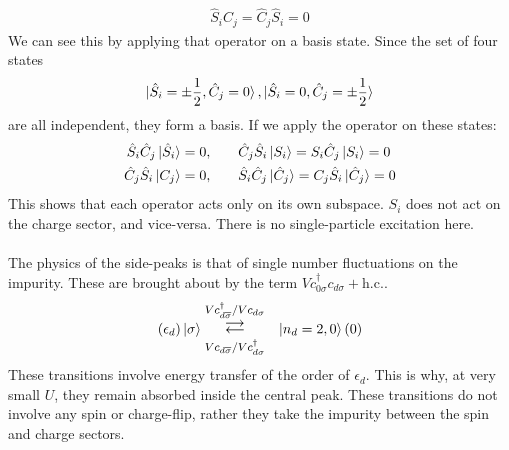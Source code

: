 \documentclass[twoside,11pt]{report}
\numberwithin{equation}{section}
\begin{document}
\begin{equation}\begin{aligned}
	\hat S_i \hat C_j = \hat C_j \hat S_i = 0
\end{aligned}\end{equation}
We can see this by applying that operator on a basis state. Since the set of four states 
\begin{equation}\begin{aligned}
	\ket{\hat S_i = \pm \frac{1}{2}, \hat C_j = 0}, \ket{\hat S_i = 0, \hat C_j = \pm\frac{1}{2}}
\end{aligned}\end{equation}
are all independent, they form a basis. If we apply the operator on these states:
\begin{equation}\begin{aligned}
	\hat S_i \hat C_j \ket{\hat S_i} &= 0, &&&&\hat C_j \hat S_i \ket{S_i} = S_i \hat C_j \ket{S_i} = 0\\
	\hat C_j \hat S_i \ket{C_j} &= 0, &&&&\hat S_i \hat C_j \ket{\hat C_j} = C_j \hat S_i \ket{\hat C_j} = 0 \\
\end{aligned}\end{equation}
This shows that each operator acts only on its own subspace. \(S_i\) does not act on the charge sector, and vice-versa. There is no single-particle excitation here.
\\\\The physics of the side-peaks is that of single number fluctuations on the impurity. These are brought about by the term \(Vc^\dagger_{0\sigma}c_{d\sigma} + \text{h.c.}\).
\begin{equation}\begin{aligned}
	\left( \epsilon_d  \right) \ket{\sigma} & \mathrel{\mathlarger{\mathlarger{\mathop{\rightleftarrows}}^{V c^\dagger_{d\overline\sigma}/V c_{d\sigma}}_{V c_{d\overline\sigma}/V c^\dagger_{d\sigma}}}} &\ket{n_d=2,0} \left( 0 \right) \\
\end{aligned}\end{equation}
These transitions involve energy transfer of the order of \(\epsilon_d\). This is why, at very small \(U\), they remain absorbed inside the central peak. These transitions do not involve any spin or charge-flip, rather they take the impurity between the spin and charge sectors.
\end{document}
